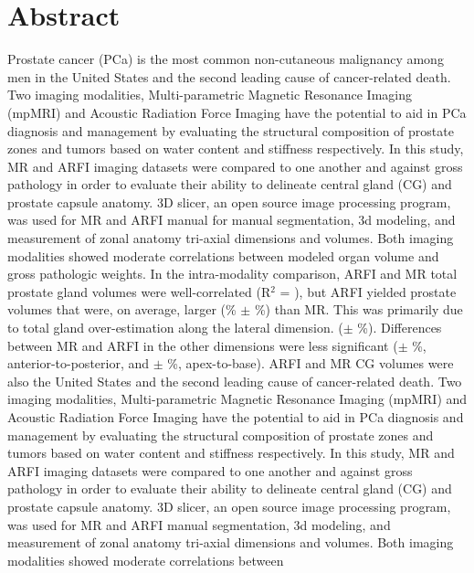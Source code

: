 \section*{Abstract}
Prostate cancer (PCa) is the most common non-cutaneous malignancy among men in
the United States and the second leading cause of cancer-related death.  Two
imaging modalities, Multi-parametric Magnetic Resonance Imaging (mpMRI) and
Acoustic Radiation Force Imaging have the potential to aid in PCa diagnosis and
management by evaluating the structural composition of prostate zones and
tumors based on water content and stiffness respectively.  In this study,
\invivo MR and ARFI imaging datasets were compared to one another and against
gross pathology in order to evaluate their ability to delineate central gland
(CG) and prostate capsule anatomy. 3D slicer, an open source image processing
program,  was used for MR and ARFI manual for manual segmentation, 3d modeling,
and measurement of zonal anatomy tri-axial dimensions and volumes.   Both
imaging modalities showed moderate correlations between modeled organ volume
and gross pathologic weights.  In the intra-modality comparison, ARFI and MR
total prostate gland volumes were well-correlated (R$^2$ = \MRarfiVolTotalRsq),
but ARFI yielded prostate volumes that were, on average, larger
(\MRarfiVolTotalMeanDiff\% $\pm$ \MRarfiVolTotalStdDiff\%) than MR. This was
primarily due to total gland over-estimation along the lateral dimension.
(\ARFImrTotalLatLatMeanPct $\pm$ \ARFImrTotalLatLatStdPct\%). Differences
between MR and ARFI in the other dimensions were less significant
(\ARFImrTotalAntPostMeanPct $\pm$ \ARFImrTotalAntPostStdPct\%,
anterior-to-posterior, and \ARFImrTotalApexBaseMeanPct $\pm$
\ARFImrTotalApexBaseStdPct\%, apex-to-base). ARFI and MR CG volumes were also
the United States and the second leading cause of cancer-related death.
Two imaging modalities, Multi-parametric Magnetic Resonance Imaging (mpMRI) and
Acoustic Radiation Force Imaging have the potential to aid in PCa
diagnosis and management by evaluating the structural composition of prostate
zones and tumors based on water content and stiffness respectively.  In this study, 
MR and ARFI imaging datasets were compared to one another and against gross pathology in order to evaluate their
ability to delineate central gland (CG) and prostate capsule anatomy. 3D slicer, an open source image processing program,  was used
 for MR and ARFI  manual segmentation, 3d modeling, and measurement of zonal anatomy tri-axial dimensions and volumes.   
 Both imaging modalities showed moderate correlations between
